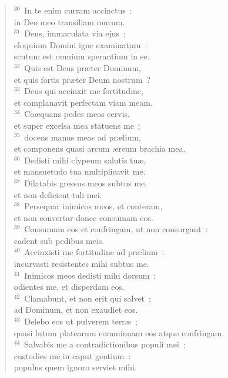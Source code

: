 \begin{flushleft}
\begin{verse}
${}^{30}$~In te enim curram accinctus~:\\ in Deo meo transiliam murum.\\
${}^{31}$~Deus, immaculata via ejus~;\\ eloquium Domini igne examinatum~:\\ scutum est omnium sperantium in se.\\
${}^{32}$~Quis est Deus pr\ae ter Dominum,\\ et quis fortis pr\ae ter Deum nostrum~?\\
${}^{33}$~Deus qui accinxit me fortitudine,\\ et complanavit perfectam viam meam.\\
${}^{34}$~Co\ae quans pedes meos cervis,\\ et super excelsa mea statuens me~;\\
${}^{35}$~docens manus meas ad pr\ae lium,\\ et componens quasi arcum \ae reum brachia mea.\\
${}^{36}$~Dedisti mihi clypeum salutis tu\ae ,\\ et mansuetudo tua multiplicavit me.\\
${}^{37}$~Dilatabis gressus meos subtus me,\\ et non deficient tali mei.\\
${}^{38}$~Persequar inimicos meos, et conteram,\\ et non convertar donec consumam eos.\\
${}^{39}$~Consumam eos et confringam, ut non consurgant~:\\ cadent sub pedibus meis.\\
${}^{40}$~Accinxisti me fortitudine ad pr\ae lium~:\\ incurvasti resistentes mihi subtus me.\\
${}^{41}$~Inimicos meos dedisti mihi dorsum~;\\ odientes me, et disperdam eos.\\
${}^{42}$~Clamabunt, et non erit qui salvet~;\\ ad Dominum, et non exaudiet eos.\\
${}^{43}$~Delebo eos ut pulverem terr\ae~;\\ quasi lutum platearum comminuam eos atque confringam.\\
${}^{44}$~Salvabis me a contradictionibus populi mei~;\\ custodies me in caput gentium~:\\ populus quem ignoro serviet mihi.\\

\end{verse}
\end{flushleft}
